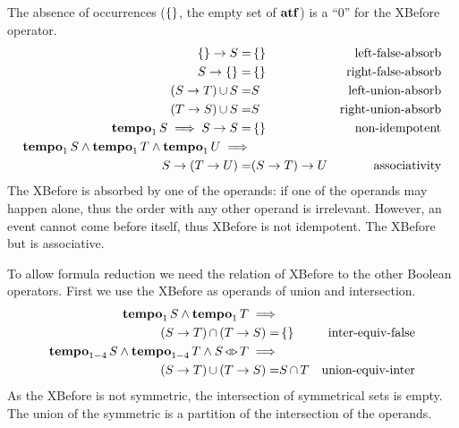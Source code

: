 \documentclass[12pt,openright,twoside,a4paper,oldfontcommands,english,brazil,final]{abntex2}
\theoremstyle{theo}
\def\xbeforeop{\ensuremath\rightarrow}
\newcommand{\xbefore}[2]{\ensuremath #1 \xbeforeop #2 }
\def\tempoop{\ensuremath\operatorname{\mathbf{tempo}}}
\newcommand{\tempo}[2][1-4]{\ensuremath\tempoop_{#1} #2}
\def\independenteventsop{\ensuremath\operatorname{\triangleleft\triangleright}}
\newcommand{\independentevents}[2]{\ensuremath #1 \independenteventsop #2}
\def\False{\ensuremath\operatorname{\left\{\right\}}}
\def\algebraset{\ensuremath\operatorname{\mathbf{atf}}}
\newcommand{\parsin}[1]{\ensuremath\left( #1 \right)}
\def\union{\ensuremath\operatorname{\cup}}
\def\inter{\ensuremath\operatorname{\cap}}
\begin{document}
The absence of occurrences ($\False$, the empty set of $\algebraset$) is a ``0'' for the \ac{XBefore} operator.
%
\begin{subequations}
\begin{align}
\xbefore{\False}{S} =&
  \False &
  \text{left-false-absorb}
  \label{thm:xbefore-of-false-1}\\
%
\xbefore{S}{\False} =&
  \False &
  \text{right-false-absorb}
  \label{thm:xbefore-of-false-2}\\
%
\left(\xbefore{S}{T}\right) \union S =& S &
  \text{left-union-absorb}
  \label{thm:xbefore-sup-absorb-1}\\
%
\left(\xbefore{T}{S}\right) \union S =& S &
  \text{right-union-absorb}
  \label{thm:xbefore-sup-absorb-2}\\
%
\tempo[1]{S} \implies
  \xbefore{S}{S} =&
  \False &
  \text{non-idempotent}
  \label{thm:xbefore-not-idempotent}\\
%
\tempo[1]{S}\land\tempo[1]{T}\land \tempo[1]{U}\implies&\nonumber\\
  \xbefore{S}{(\xbefore{T}{U})} =&
  \xbefore{(\xbefore{S}{T})}{U} &
  \text{associativity}
  \label{thm:xbefore-associativity}
%
\end{align}
\end{subequations}
%
The \ac{XBefore} is absorbed by one of the operands: if one of the operands may happen alone, thus the order with any other operand is irrelevant.
However, an event cannot come before itself, thus \ac{XBefore} is not idempotent.
The \ac{XBefore} but is associative.

To allow formula reduction we need the relation of \ac{XBefore} to the other Boolean operators.
First we use the \ac{XBefore} as operands of union and intersection.
%
\begin{subequations}
\begin{align}
\tempo[1]{S} \land \tempo[1]{T}\implies&\nonumber\\
  \parsin{\xbefore{S}{T}} \inter \parsin{\xbefore{T}{S}} =&
  \False &
  \text{inter-equiv-false}
  \label{thm:xbefore-inf-equiv-bot}\\
%
\tempo{S} \land \tempo{T} \land \independentevents{S}{T}\implies&\nonumber\\
  \parsin{\xbefore{S}{T}} \union \parsin{\xbefore{T}{S}} =&
  S \inter T &
  \text{union-equiv-inter}
  \label{thm:xbefore-sup-equiv-inf}
%
\end{align}
\end{subequations}
%
As the \ac{XBefore} is not symmetric, the intersection of symmetrical sets is empty.
The union of the symmetric is a partition of the intersection of the operands.
\end{document}
